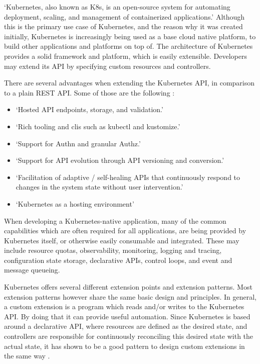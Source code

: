 \enquote*{Kubernetes, also known as K8s, is an open-source system for automating deployment, scaling, and management of containerized applications.}
\autocite{kubernetesIoWebsite}
Although this is the primary use case of Kubernetes,
and the reason why it was created initially,
Kubernetes is increasingly being used as a base cloud native platform,
to build other applications and platforms on top of.
The architecture of Kubernetes provides a solid framework and platform,
which is easily extensible.
Developers may extend its API by specifying custom resources and controllers.

There are several advantages when extending the Kubernetes API,
in comparison to a plain REST API.
Some of those are the following
\autocite{kubebuilderBookWebsite}:

\begin{itemize}
	\item \enquote*{Hosted API endpoints, storage, and validation.}
	\item \enquote*{Rich tooling and clis such as kubectl and kustomize.}
	\item \enquote*{Support for Authn and granular Authz.}
	\item \enquote*{Support for API evolution through API versioning and conversion.}
	\item \enquote*{Facilitation of adaptive / self-healing APIs that continuously respond to changes in the system state without user intervention.}
	\item \enquote*{Kubernetes as a hosting environment}
	\autocite{kubebuilderBookWebsite}
\end{itemize}

When developing a Kubernetes-native application,
many of the common capabilities which are often required for all applications,
are being provided by Kubernetes itself, or otherwise easily consumable and integrated.
These may include resource quotas, observability, monitoring, logging and tracing,
configuration state storage, declarative APIs, control loops, and event and message queueing.

Kubernetes offers several different extension points and extension patterns.
Most extension patterns however share the same basic design and principles.
In general, a custom extension is a program which reads and/or writes
to the Kubernetes API. By doing that it can provide useful automation.
Since Kubernetes is based around a declarative API,
where resources are defined as the desired state,
and controllers are responsible for continuously reconciling this
desired state with the actual state,
it has shown to be a good pattern to design custom extensions in the same way
\autocite{extendKubernetes}.

